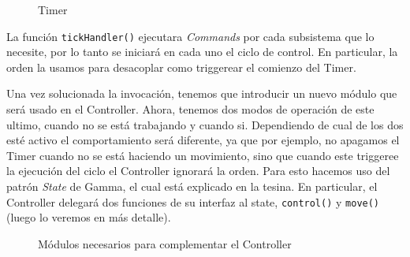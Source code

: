 \begin{figure}[h]
\caption{Timer}
\begin{center}
\end{center}
\end{figure}

La función \verb|tickHandler()| ejecutara \textit{Commands} por cada subsistema que lo necesite, por lo tanto se iniciará en cada uno el ciclo de control. En particular, la orden la usamos para desacoplar como triggerear el comienzo del Timer.

Una vez solucionada la invocación, tenemos que introducir un nuevo módulo que será usado en el Controller. Ahora, tenemos dos modos de operación de este ultimo, cuando no se está trabajando y cuando si. Dependiendo de cual de los dos esté activo el comportamiento será diferente, ya que por ejemplo, no apagamos el Timer cuando no se está haciendo un movimiento, sino que cuando este triggeree la ejecución del ciclo el Controller ignorará la orden. Para esto hacemos uso del patrón \textit{State} de Gamma, el cual está explicado en la tesina. En particular, el Controller delegará dos funciones de su interfaz al state, \verb|control()| y \verb|move()| (luego lo veremos en más detalle).

\begin{figure}[h]
\caption{Módulos necesarios para complementar el Controller}
\begin{center}
\end{center}
\end{figure}

